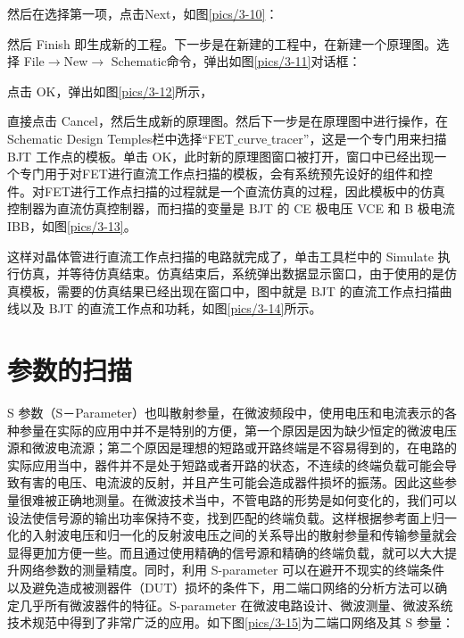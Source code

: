 然后在选择第一项，点击Next，如图\ref{pics/3-10}：

然后 Finish 即生成新的工程。下一步是在新建的工程中，在新建一个原理图。选择 File$\rightarrow$New$\rightarrow$ Schematic命令，弹出如图\ref{pics/3-11}对话框：

点击 OK，弹出如图\ref{pics/3-12}所示，

直接点击 Cancel，然后生成新的原理图。然后下一步是在原理图中进行操作，在 Schematic Design Temples栏中选择“FET$\_$curve$\_$tracer”，这是一个专门用来扫描 BJT 工作点的模板。单击 OK，此时新的原理图窗口被打开，窗口中已经出现一个专门用于对FET进行直流工作点扫描的模板，会有系统预先设好的组件和控件。对FET进行工作点扫描的过程就是一个直流仿真的过程，因此模板中的仿真控制器为直流仿真控制器，而扫描的变量是 BJT 的 CE 极电压 VCE 和 B 极电流 IBB，如图\ref{pics/3-13}。

这样对晶体管进行直流工作点扫描的电路就完成了，单击工具栏中的 Simulate 执行仿真，并等待仿真结束。仿真结束后，系统弹出数据显示窗口，由于使用的是仿真模板，需要的仿真结果已经出现在窗口中，图中就是 BJT 的直流工作点扫描曲线以及 BJT 的直流工作点和功耗，如图\ref{pics/3-14}所示。

\section{参数的扫描}

S 参数（S－Parameter）也叫散射参量，在微波频段中，使用电压和电流表示的各种参量在实际的应用中并不是特别的方便，第一个原因是因为缺少恒定的微波电压源和微波电流源；第二个原因是理想的短路或开路终端是不容易得到的，在电路的实际应用当中，器件并不是处于短路或者开路的状态，不连续的终端负载可能会导致有害的电压、电流波的反射，并且产生可能会造成器件损坏的振荡。因此这些参量很难被正确地测量。在微波技术当中，不管电路的形势是如何变化的，我们可以设法使信号源的输出功率保持不变，找到匹配的终端负载。这样根据参考面上归一化的入射波电压和归一化的反射波电压之间的关系导出的散射参量和传输参量就会显得更加方便一些。而且通过使用精确的信号源和精确的终端负载，就可以大大提升网络参数的测量精度。同时，利用 S-parameter 可以在避开不现实的终端条件以及避免造成被测器件（DUT）损坏的条件下，用二端口网络的分析方法可以确定几乎所有微波器件的特征。S-parameter 在微波电路设计、微波测量、微波系统技术规范中得到了非常广泛的应用。如下图\ref{pics/3-15}为二端口网络及其 S 参量：

